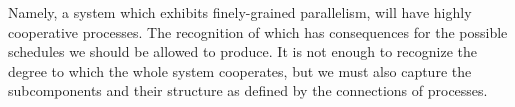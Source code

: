 Namely, a system which exhibits finely-grained parallelism, will have highly
cooperative processes. The recognition of which has consequences for the 
possible schedules we should be allowed to produce. It is not enough to 
recognize the degree to which the whole system cooperates, but we must also
capture the subcomponents and their structure as defined by the connections
of processes.


